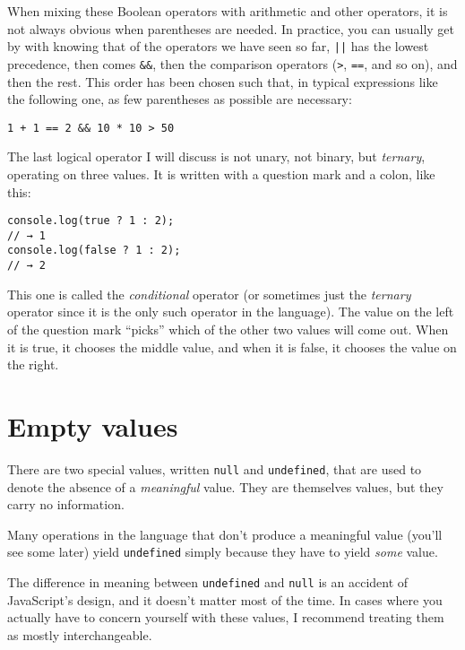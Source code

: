 When mixing these Boolean operators with arithmetic and other operators, it is not always obvious when parentheses are needed. In practice, you can usually get by with knowing that of the operators we have seen so far, \lstinline`||` has the lowest precedence, then comes \lstinline`&&`, then the comparison operators (\lstinline`>`, \lstinline`==`, and so on), and then the rest. This order has been chosen such that, in typical expressions like the following one, as few parentheses as possible are necessary:

\begin{lstlisting}
1 + 1 == 2 && 10 * 10 > 50
\end{lstlisting}
\noindent{}

The last logical operator I will discuss is not unary, not binary, but \emph{ternary}, operating on three values. It is written with a question mark and a colon, like this:

\begin{lstlisting}
console.log(true ? 1 : 2);
// → 1
console.log(false ? 1 : 2);
// → 2
\end{lstlisting}
\noindent

This one is called the \emph{conditional} operator (or sometimes just the \emph{ternary} operator since it is the only such operator in the language). The value on the left of the question mark ``picks'' which of the other two values will come out. When it is true, it chooses the middle value, and when it is false, it chooses the value on the right.

\section{Empty values}

There are two special values, written \lstinline`null` and \lstinline`undefined`, that are used to denote the absence of a \emph{meaningful} value. They are themselves values, but they carry no information.

Many operations in the language that don't produce a meaningful value (you'll see some later) yield \lstinline`undefined` simply because they have to yield \emph{some} value.

The difference in meaning between \lstinline`undefined` and \lstinline`null` is an accident of JavaScript's design, and it doesn't matter most of the time. In cases where you actually have to concern yourself with these values, I recommend treating them as mostly interchangeable.

